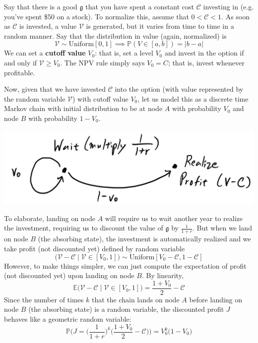 \documentclass{article}
\begin{document}
      Say that there is a good $\mathfrak{g}$ that you have spent a constant cost $\mathcal{C}$ investing in (e.g. you've spent \$50 on a stock). To normalize this, assume that $0 < \mathcal{C} < 1$. As soon as $\mathcal{C}$ is invested, a value $\mathcal{V}$ is generated, but it varies from time to time in a random manner. Say that the distribution in value (again, normalized) is
      \[\mathcal{V} \sim \text{Uniform}[0,1] \implies \mathbb{P}(V \in [a,b]) = |b-a|\]
      We can set a \textbf{cutoff value} $V_0$: that is, set a level $V_0$ and invest in the option if and only if $\mathcal{V} \geq V_0$. The NPV rule simply says $V_0 = C$; that is, invest whenever profitable. 

      Now, given that we have invested $\mathcal{C}$ into the option (with value represented by the random variable $\mathcal{V}$) with cutoff value $V_0$, let us model this as a discrete time Markov chain with initial distribution to be at node $A$ with probability $V_0$ and node $B$ with probability $1-V_0$. 
      \begin{center}
        \includegraphics[scale=0.25]{img/Option_Investment_Graph.PNG}
      \end{center}
      To elaborate, landing on node $A$ will require us to wait another year to realize the investment, requiring us to discount the value of $\mathfrak{g}$ by $\frac{1}{1+r}$. But when we land on node $B$ (the absorbing state), the investment is automatically realized and we take profit (not discounted yet) defined by random variable
      \[\big( \mathcal{V} - \mathcal{C} \;|\; \mathcal{V} \in [V_0, 1]\big) \sim \text{Uniform}[V_0 - \mathcal{C}, 1 - \mathcal{C}]\]
      However, to make things simpler, we can just compute the expectation of profit (not discounted yet) upon landing on node $B$. By linearity,
      \[\mathbb{E} \big( \mathcal{V} - \mathcal{C} \;|\; \mathcal{V} \in [V_0, 1]\big) = \frac{1 + V_0}{2} - \mathcal{C}\]
      Since the number of times $k$ that the chain lands on node $A$ before landing on node $B$ (the absorbing state) is a random variable, the discounted profit $J$ behaves like a geometric random variable: 
      \[\mathbb{P} \Bigg( J = \bigg(\frac{1}{1+r}\bigg)^k \bigg(\frac{1 + V_0}{2} - \mathcal{C} \bigg) \Bigg) = V_0^k \big( 1-V_0\big)\]
\end{document}
